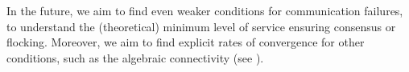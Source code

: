 \documentclass[journal]{article}
\begin{document}
In the future, we aim to find even weaker conditions for communication failures, to understand the (theoretical) minimum level of service ensuring consensus or flocking. Moreover, we aim to find explicit rates of convergence for other conditions, such as the algebraic connectivity (see \cite{bonnet2023consensus}).



\end{document}
